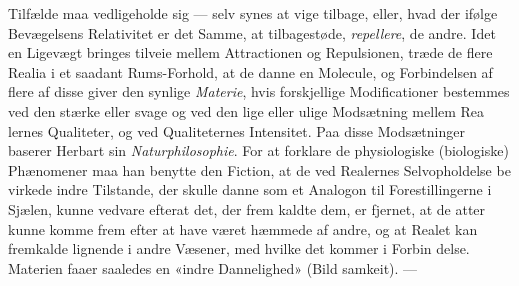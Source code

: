 \documentclass[12pt,a4paper]{book}
\begin{document}
Tilfælde maa vedligeholde sig --- selv synes at vige tilbage,
eller, hvad der ifølge Bevægelsens Relativitet er det Samme, at
tilbagestøde, \emph{repellere}, de andre. Idet en Ligevægt bringes
tilveie mellem Attractionen og Repulsionen, træde de flere
Realia i et saadant Rums-Forhold, at de danne en Molecule,
og Forbindelsen af flere af disse giver den synlige \emph{Materie},
hvis forskjellige Modificationer bestemmes ved den stærke eller
svage og ved den lige eller ulige Modsætning mellem Rea\-%
lernes Qualiteter, og ved Qualiteternes Intensitet. Paa disse
Modsætninger baserer Herbart sin \emph{Naturphilosophie}. For
at forklare de physiologiske (biologiske) Phænomener maa han
benytte den Fiction, at de ved Realernes Selvopholdelse be\-%
virkede indre Tilstande, der skulle danne som et Analogon til
Forestillingerne i Sjælen, kunne vedvare efterat det, der frem\-%
kaldte dem, er fjernet, at de atter kunne komme frem efter at
have været hæmmede af andre, og at Realet kan fremkalde
lignende i andre Væsener, med hvilke det kommer i Forbin\-%
delse. Materien faaer saaledes en «indre Dannelighed» (Bild\-%
samkeit). ---
\end{document}
